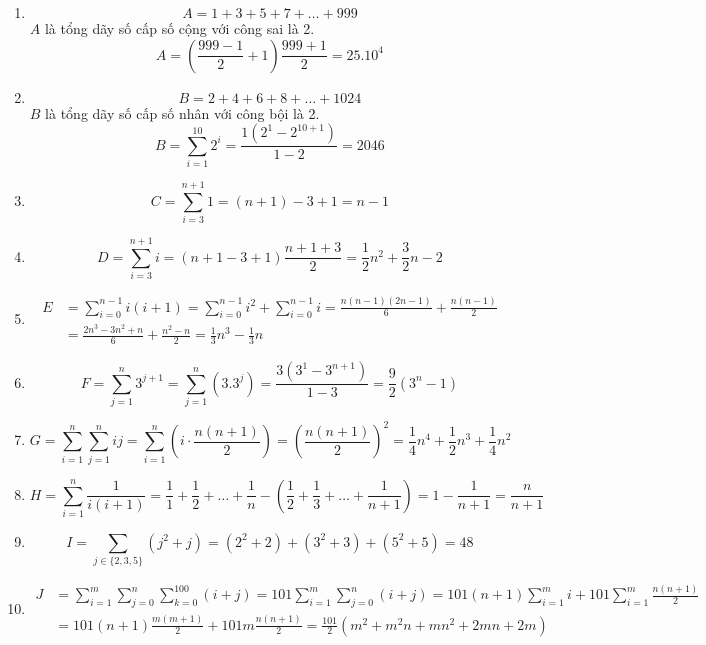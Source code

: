 \documentclass[../HW01.tex]{subfiles}
\begin{document}
    \begin{enumerate}[label=(\alph*)]
        \item $$ A = 1 + 3 + 5 + 7 + \dots + 999$$
        $A$ là tổng dãy số cấp số cộng với công sai là 2.
        $$ A = \left(\frac{999-1}{2} + 1\right)\frac{999+1}{2} = 25.10^4$$

        \item $$ B = 2 + 4 + 6 + 8 + \dots + 1024$$
        $B$ là tổng dãy số cấp số nhân với công bội là 2.
        $$ B = \sum_{i=1}^{10} 2^i = \frac{1(2^1-2^{10+1})}{1-2} = 2046$$

        \item $$ C=\sum_{i=3}^{n+1}1=(n+1)-3+1=n-1$$
        
        \item $$ D=\sum_{i=3}^{n+1}i=(n+1-3+1)\frac{n+1+3}{2}=\frac{1}{2}n^2+\frac{3}{2}n-2$$
        
        \item 
        \begin{align*}
            E&=\sum_{i=0}^{n-1}i(i+1)=\sum_{i=0}^{n-1}i^2+\sum_{i=0}^{n-1}i=\frac{n(n-1)(2n-1)}{6}+\frac{n(n-1)}{2}\\
            &=\frac{2n^3-3n^2+n}{6}+\frac{n^2-n}{2}=\frac{1}{3}n^3-\frac{1}{3}n
        \end{align*}
        
        \item $$ F= \sum_{j=1}^{n}3^{j+1}=\sum_{j=1}^{n}(3.3^j)=\frac{3(3^1-3^{n+1})}{1-3}=\frac{9}{2}(3^n-1)$$
        
        \item $$ G =\sum_{i=1}^{n}\sum_{j=1}^{n}ij=\sum_{i=1}^{n}\left(i\cdot\frac{n(n+1)}{2}\right)=\left(\frac{n(n+1)}{2}\right)^2=\frac{1}{4}n^4+\frac{1}{2}n^3+\frac{1}{4}n^2$$
        
        \item $$ H =\sum_{i=1}^{n}\frac{1}{i(i+1)}=\frac{1}{1}+\frac{1}{2}+\dots+\frac{1}{n}-\left(\frac{1}{2}+\frac{1}{3}+\dots+\frac{1}{n+1}\right)=1-\frac{1}{n+1}=\frac{n}{n+1}$$
        
        \item $$ I =\sum_{j\in\{2,3,5\}}^{}(j^2+j)=(2^2+2)+(3^2+3)+(5^2+5)=48$$
        
        \item 
        \begin{align*}
            J&=\sum_{i=1}^{m}\sum_{j=0}^{n}\sum_{k=0}^{100}(i+j)=101\sum_{i=1}^{m}\sum_{j=0}^{n}(i+j)
            =101(n+1)\sum_{i=1}^{m}i+101\sum_{i=1}^{m}\frac{n(n+1)}{2}\\
            &=101(n+1)\frac{m(m+1)}{2}+101m\frac{n(n+1)}{2}=\frac{101}{2}(m^2+m^2n+mn^2+2mn+2m)
        \end{align*}
    \end{enumerate}
\end{document}
